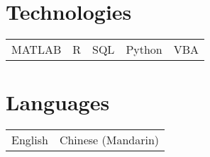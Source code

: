 \documentclass[a4paper,10pt]{article}
\begin{document}

\section{Technologies}
\begin{tabular}{l|l|l|l|l}	
MATLAB & R & SQL & Python & VBA
\end{tabular}

\section{Languages}
\begin{tabular}{l|l}	
English & Chinese (Mandarin) 
\end{tabular}
\end{document}
